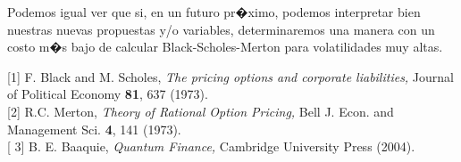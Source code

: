 \documentclass[portrait, a0b,final]{a0poster}%
\numberwithin{equation}{section}
\newenvironment{poster}{
  \begin{center}
  \begin{minipage}[c]{0.98\textwidth}
}{
  \end{minipage}
  \end{center}
}
\newenvironment{pcolumn}[1]{
  \begin{minipage}{#1\textwidth}
  \begin{center}
}{
  \end{center}
  \end{minipage}
}
\newcommand{\pbox}[4]{
\psshadowbox[#3]{
\begin{minipage}[t][#2][t]{#1}
#4
\end{minipage}
}}
\begin{document}
\begin{poster}
\begin{center}
\begin{pcolumn}{0.32}
{Podemos igual ver que si, en un futuro pr�ximo, podemos interpretar bien nuestras nuevas propuestas y/o variables, determinaremos una manera con un costo m�s bajo de calcular Black-Scholes-Merton para volatilidades muy altas.


\vspace{2cm}
    \begin{center}
        \pbox{0.8\textwidth}{}%
        {linewidth=2mm,framearc=0.1,linecolor=lightblue,fillstyle=gradient,gradangle=0,%
        gradbegin=white,gradend=whiteblue,gradmidpoint=1.0,framesep=1em}{%
        \begin{center}
          Referencias
        \end{center}}
    \end{center}







[1] F. Black and  M. Scholes, {\it The pricing options and corporate liabilities,} Journal of Political Economy  {\bf 81},  637 (1973).\\

[2] R.C. Merton, {\it Theory of Rational Option Pricing,}  Bell J. Econ. and Management Sci.   {\bf 4},  141 (1973).\\

[ 3] B. E. Baaquie,  {\it Quantum Finance,} Cambridge University Press (2004).

}
\end{pcolumn}
\end{center}




\end{poster}
\end{document}
